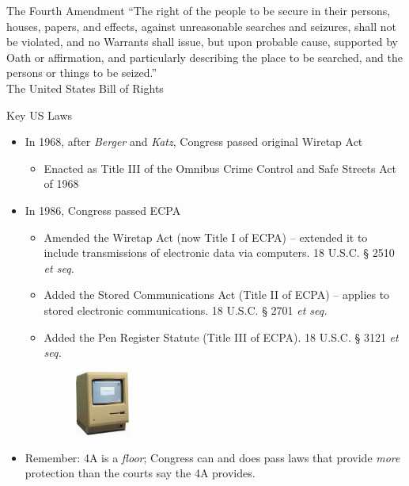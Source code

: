 \documentclass[nobackground,dvipsnames,table,aspectratio=169]{beamer}
\begin{document}
\begin{frame}{The Fourth Amendment}
    “The right of the people to be secure in their  persons,  houses,  papers,  and effects,  against  unreasonable  searches and  seizures,  shall  not  be  violated,  and no  Warrants  shall  issue,  but  upon probable  cause,  supported  by  Oath  or affirmation,  and  particularly  describing the  place  to  be  searched,  and  the persons or things to be seized.”\\
    \small{The United States Bill of Rights}
\end{frame}

\begin{frame}{Key US Laws}
    \begin{itemize}
        \item In 1968, after \textit{Berger} and \textit{Katz}, Congress passed original Wiretap Act
        \begin{itemize}
            \item Enacted as Title III of the Omnibus Crime Control and Safe Streets Act of 1968
        \end{itemize}
        
        \item In 1986, Congress passed ECPA
        \begin{itemize}
            \item Amended the Wiretap Act (now Title I of ECPA) -- extended it to include transmissions of electronic data via computers. 18 U.S.C. § 2510 \textit{et seq.}
            \item Added the Stored Communications Act (Title II of ECPA) -- applies to stored electronic communications. 18 U.S.C. § 2701 \textit{et seq.}
            \item Added the Pen Register Statute (Title III of ECPA). 18 U.S.C. § 3121 \textit{et seq.}
            \begin{figure}
                \includegraphics[width=0.18\textwidth]{old-computer}
            \end{figure} %
        \end{itemize}
        
        \item Remember: 4A is a \textit{floor}; Congress can and does pass laws that provide \textit{more} protection than the courts say the 4A provides.
    \end{itemize}
\end{frame}
\end{document}
